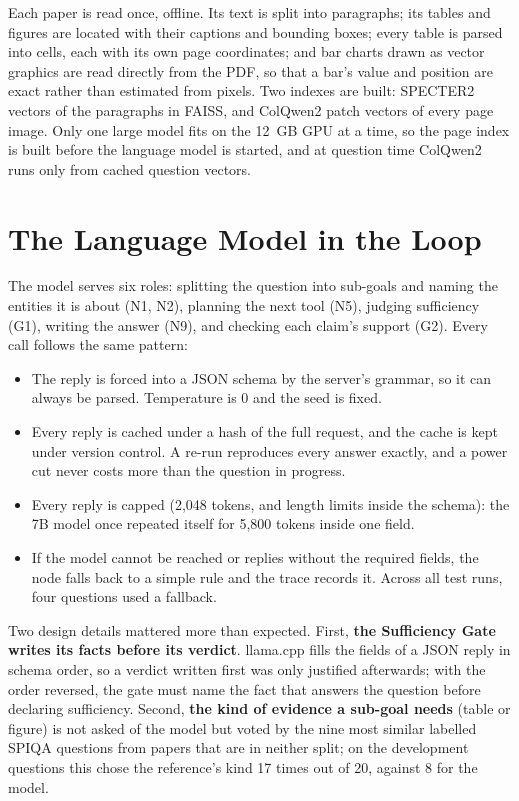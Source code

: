 Each paper is read once, offline. Its text is split into paragraphs; its tables and
figures are located with their captions and bounding boxes; every table is parsed
into cells, each with its own page coordinates; and bar charts drawn as vector
graphics are read directly from the PDF, so that a bar's value and position are
exact rather than estimated from pixels. Two indexes are built: SPECTER2 vectors of
the paragraphs in FAISS, and ColQwen2 patch vectors of every page image. Only one
large model fits on the 12~GB GPU at a time, so the page index is built before the
language model is started, and at question time ColQwen2 runs only from cached
question vectors.

\section{The Language Model in the Loop}

The model serves six roles: splitting the question into sub-goals and naming the
entities it is about (N1, N2), planning the next tool (N5), judging sufficiency (G1),
writing the answer (N9), and checking each claim's support (G2). Every call follows
the same pattern:

\begin{itemize}
    \item The reply is forced into a JSON schema by the server's grammar, so it can
    always be parsed. Temperature is 0 and the seed is fixed.
    \item Every reply is cached under a hash of the full request, and the cache is
    kept under version control. A re-run reproduces every answer exactly, and a power
    cut never costs more than the question in progress.
    \item Every reply is capped (2{,}048 tokens, and length limits inside the schema):
    the 7B model once repeated itself for 5{,}800 tokens inside one field.
    \item If the model cannot be reached or replies without the required fields, the
    node falls back to a simple rule and the trace records it. Across all test runs,
    four questions used a fallback.
\end{itemize}

Two design details mattered more than expected. First, \textbf{the Sufficiency Gate
writes its facts before its verdict}. llama.cpp fills the fields of a JSON reply in
schema order, so a verdict written first was only justified afterwards; with the
order reversed, the gate must name the fact that answers the question before
declaring sufficiency. Second, \textbf{the kind of evidence a sub-goal needs} (table
or figure) is not asked of the model but voted by the nine most similar labelled SPIQA
questions from papers that are in neither split; on the development questions this
chose the reference's kind 17 times out of 20, against 8 for the model.


